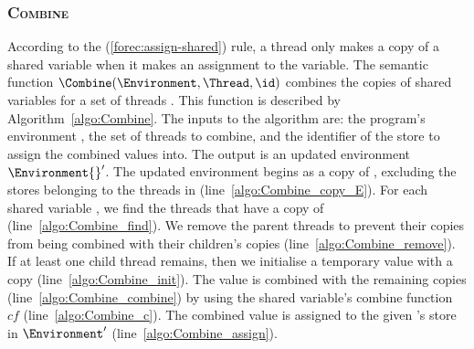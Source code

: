 \subsubsection{\textsc{Combine}}
\label{sec:forec_Combine}
According to the (\ref{forec:assign-shared}) rule, a thread only 
makes a copy of a shared variable when it makes an assignment to the 
variable. The semantic function $\Combine(\Environment, \Thread, \id)$ 
combines the copies of shared variables for a set of threads \Thread{}. This function
is described by Algorithm~\ref{algo:Combine}. The inputs
to the algorithm are: the program's environment \Environment{},
the set of threads \Thread{} to combine, and the 
identifier \id{} of the store to assign the combined
values into. The output is an updated environment $\Environment{}'$.
The updated environment begins as a copy of \Environment{}, excluding
the stores belonging to the threads in \Thread{} (line~\ref{algo:Combine_copy_E}). 
For each shared variable \var{}, we find the threads that 
have a copy of \var{} (line~\ref{algo:Combine_find}). 
We remove the parent threads to prevent their copies from 
being combined with their children's copies (line~\ref{algo:Combine_remove}).
If at least one child thread remains, then we initialise 
a temporary value \val{} with a copy (line~\ref{algo:Combine_init}). 
The value is combined with the remaining copies (line~\ref{algo:Combine_combine}) 
by using the shared variable's combine function $cf$ 
(line~\ref{algo:Combine_c}). The combined value is assigned 
to the given \id{}'s store in $\Environment'$
(line~\ref{algo:Combine_assign}).

